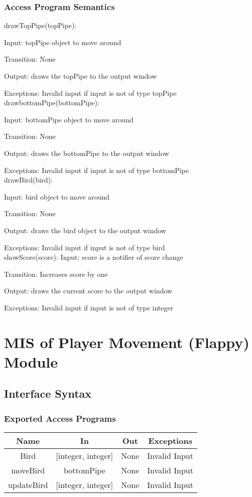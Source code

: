 \documentclass[12pt, titlepage]{article}
\begin{document}
		
		\subsubsection{Access Program Semantics}
		
		
		drawTopPipe(topPipe):
		
		Input: topPipe object to move around

		
		Transition: None
		
		Output: draws the topPipe to the output window
		
		Exceptions: Invalid input if input is not of type topPipe\\
		
		drawbottomPipe(bottomPipe):
		
		Input: bottomPipe object to move around

		
		Transition: None
		
		Output: draws the bottomPipe to the output window
		
		Exceptions: Invalid input if input is not of type bottomPipe\\
		
		drawBird(bird):
		
		Input: bird object to move around
		
		Transition: None
		
		Output: draws the bird object to the output window
		
		Exceptions: Invalid input if input is not of type bird\\
		
		showScore(score):
		Input: score is a notifier of score change
		
		Transition: Increases score by one
		
		Output: draws the current score to the output window
		
		Exceptions: Invalid input if input is not of type integer\\
		
		
\section{MIS of Player Movement (Flappy) Module}
		\subsection{Interface Syntax}
		\subsubsection{Exported Access Programs}
		\begin{tabular}[pos]{|c|c|c|c|}
			\hline
			\textbf{Name}& \textbf{In} & \textbf{Out} & \textbf{Exceptions} \\ \hline
			Bird & [integer, integer] & None & Invalid Input \\ \hline
			moveBird & bottomPipe & None & Invalid Input \\ \hline
			updateBird & [integer, integer] & None & Invalid Input \\ \hline

			
		\end{tabular}
		
\end{document}
